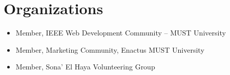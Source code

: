 \section*{Organizations}
\begin{itemize}
    \item Member, IEEE Web Development Community -- MUST University
    \item Member, Marketing Community, Enactus MUST University
    \item Member, Sona' El Haya Volunteering Group
\end{itemize}
